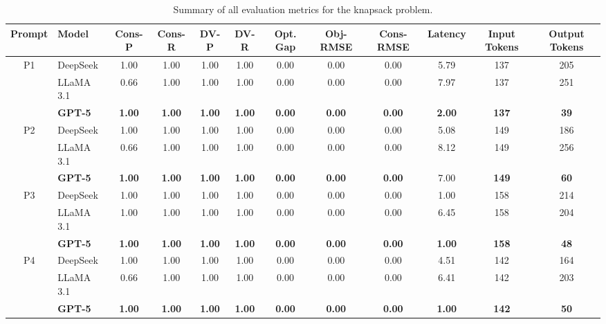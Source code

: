 \documentclass[review,12pt]{elsarticle}
\begin{document}
\begin{table}[htbp]
\centering
\caption{Summary of all evaluation metrics for the knapsack problem.}
\label{table:knapsack_summary}
\renewcommand{\arraystretch}{0.9} %
\setlength{\tabcolsep}{2pt}      %
\scriptsize                       %

\begin{adjustbox}{max width=\textwidth}
\begin{tabular}{c l c c c c c c c c c c}
\toprule
\textbf{Prompt} & \textbf{Model} & \textbf{Cons-P} & \textbf{Cons-R} & \textbf{DV-P} & \textbf{DV-R} & \textbf{Opt. Gap} & \textbf{Obj-RMSE} & \textbf{Cons-RMSE} & \textbf{Latency} & \textbf{Input Tokens} & \textbf{Output Tokens} \\  
\midrule
P1 & DeepSeek & 1.00 & 1.00 & 1.00 & 1.00 & 0.00 & 0.00 & 0.00 & 5.79 & 137 & 205 \\ [-4pt]
   & LLaMA 3.1 & 0.66 & 1.00 & 1.00 & 1.00 & 0.00 & 0.00 & 0.00 & 7.97 & 137 & 251 \\[-4pt]
   & \textbf{GPT-5} & \textbf{1.00} & \textbf{1.00} & \textbf{1.00} & \textbf{1.00} & \textbf{0.00} & \textbf{0.00} & \textbf{0.00} & \textbf{2.00} & \textbf{137} & \textbf{39} \\
\midrule
P2 & DeepSeek & 1.00 & 1.00 & 1.00 & 1.00 & 0.00 & 0.00 & 0.00 & 5.08 & 149 & 186 \\[-4pt]
   & LLaMA 3.1 & 0.66 & 1.00 & 1.00 & 1.00 & 0.00 & 0.00 & 0.00 & 8.12 & 149 & 256 \\[-4pt]
   & \textbf{GPT-5} & \textbf{1.00} & \textbf{1.00} & \textbf{1.00} & \textbf{1.00} & \textbf{0.00} & \textbf{0.00} & \textbf{0.00} & 7.00 & \textbf{149} & \textbf{60} \\
\midrule
P3 & DeepSeek & 1.00 & 1.00 & 1.00 & 1.00 & 0.00 & 0.00 & 0.00 & 1.00 & 158 & 214 \\[-4pt]
   & LLaMA 3.1 & 1.00 & 1.00 & 1.00 & 1.00 & 0.00 & 0.00 & 0.00 & 6.45 & 158 & 204 \\[-4pt]
   & \textbf{GPT-5} & \textbf{1.00} & \textbf{1.00} & \textbf{1.00} & \textbf{1.00} & \textbf{0.00} & \textbf{0.00} & \textbf{0.00} & \textbf{1.00} & \textbf{158} & \textbf{48} \\
\midrule
P4 & DeepSeek & 1.00 & 1.00 & 1.00 & 1.00 & 0.00 & 0.00 & 0.00 & 4.51 & 142 & 164 \\[-4pt]
   & LLaMA 3.1 & 0.66 & 1.00 & 1.00 & 1.00 & 0.00 & 0.00 & 0.00 & 6.41 & 142 & 203 \\[-4pt]
   & \textbf{GPT-5} & \textbf{1.00} & \textbf{1.00} & \textbf{1.00} & \textbf{1.00} & \textbf{0.00} & \textbf{0.00} & \textbf{0.00} & \textbf{1.00} & \textbf{142} & \textbf{50} \\

\end{tabular}
\end{adjustbox}
\end{table}
\end{document}
